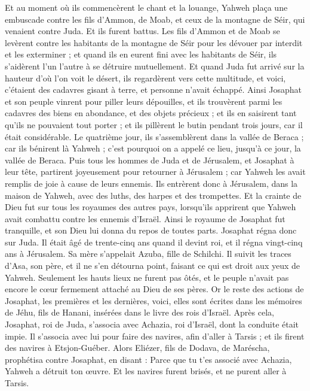 \begin{multicols}{2}
Et au moment où ils commencèrent le chant et la louange, Yahweh plaça une embuscade contre les fils d'Ammon, de Moab, et ceux de la montagne de Séir, qui venaient contre Juda. Et ils furent battus.
Les fils d'Ammon et de Moab se levèrent contre les habitants de la montagne de Séir pour les dévouer par interdit et les exterminer ; et quand ils en eurent fini avec les habitants de Séir, ils s'aidèrent l'un l'autre à se détruire mutuellement.
Et quand Juda fut arrivé sur la hauteur d'où l'on voit le désert, ils regardèrent vers cette multitude, et voici, c'étaient des cadavres gisant à terre, et personne n'avait échappé.
Ainsi Josaphat et son peuple vinrent pour piller leurs dépouilles, et ils trouvèrent parmi les cadavres des biens en abondance, et des objets précieux ; et ils en saisirent tant qu'ils ne pouvaient tout porter ; et ils pillèrent le butin pendant trois jours, car il était considérable.
Le quatrième jour, ils s'assemblèrent dans la vallée de Beraca ; car ils bénirent là Yahweh ; c'est pourquoi on a appelé ce lieu, jusqu'à ce jour, la vallée de Beraca.
Puis tous les hommes de Juda et de Jérusalem, et Josaphat à leur tête, partirent joyeusement pour retourner à Jérusalem ; car Yahweh les avait remplis de joie à cause de leurs ennemis.
Ils entrèrent donc à Jérusalem, dans la maison de Yahweh, avec des luths, des harpes et des trompettes.
Et la crainte de Dieu fut sur tous les royaumes des autres pays, lorsqu'ils apprirent que Yahweh avait combattu contre les ennemis d'Israël.
Ainsi le royaume de Josaphat fut tranquille, et son Dieu lui donna du repos de toutes parts.
Josaphat régna donc sur Juda. Il était âgé de trente-cinq ans quand il devint roi, et il régna vingt-cinq ans à Jérusalem. Sa mère s'appelait Azuba, fille de Schilchi.
Il suivit les traces d'Asa, son père, et il ne s'en détourna point, faisant ce qui est droit aux yeux de Yahweh.
Seulement les hauts lieux ne furent pas ôtés, et le peuple n'avait pas encore le cœur fermement attaché au Dieu de ses pères.
Or le reste des actions de Josaphat, les premières et les dernières, voici, elles sont écrites dans les mémoires de Jéhu, fils de Hanani, insérées dans le livre des rois d'Israël.
Après cela, Josaphat, roi de Juda, s'associa avec Achazia, roi d'Israël, dont la conduite était impie.
Il s'associa avec lui pour faire des navires, afin d'aller à Tarsis ; et ils firent des navires à Etsjon-Guéber.
Alors Eliézer, fils de Dodava, de Maréscha, prophétisa contre Josaphat, en disant : Parce que tu t'es associé avec Achazia, Yahweh a détruit ton œuvre. Et les navires furent brisés, et ne purent aller à Tarsis.

\end{multicols}

